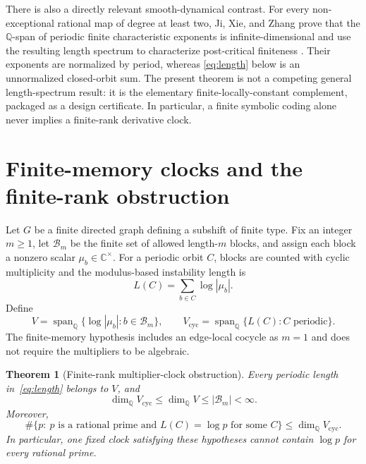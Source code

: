 \documentclass[11pt]{article}
\newtheorem{theorem}{Theorem}
\theoremstyle{definition}
\theoremstyle{remark}
\newcommand{\Q}{\mathbb{Q}}
\newcommand{\C}{\mathbb{C}}
\newcommand{\Bm}{\mathcal{B}_m}
\newcommand{\Vcyc}{V_{\mathrm{cyc}}}
\begin{document}
There is also a directly relevant smooth-dynamical contrast.  For every
non-exceptional rational map of degree at least two, Ji, Xie, and Zhang prove
that the \(\Q\)-span of periodic finite characteristic exponents is
infinite-dimensional and use the resulting length spectrum to characterize
post-critical finiteness \citep{ji2026space}.  Their exponents are normalized
by period, whereas \eqref{eq:length} below is an unnormalized closed-orbit
sum.  The present theorem is not a competing general length-spectrum result:
it is the elementary finite-locally-constant complement, packaged as a design
certificate.  In particular, a finite symbolic coding alone never implies a
finite-rank derivative clock.

\section{Finite-memory clocks and the finite-rank obstruction}
\label{sec:theorem}

Let \(G\) be a finite directed graph defining a subshift of finite type.  Fix
an integer \(m\geq1\), let \(\Bm\) be the finite set of allowed
length-\(m\) blocks, and assign each block a nonzero scalar
\(\mu_b\in\C^\times\).  For a periodic orbit \(C\), blocks are counted with
cyclic multiplicity and the modulus-based instability length is
\begin{equation}
 L(C)=\sum_{b\in C}\log|\mu_b|.
 \label{eq:length}
\end{equation}
Define
\begin{equation}
 V=\operatorname{span}_{\Q}
 \{\log|\mu_b|:b\in\Bm\},
 \qquad
 \Vcyc=\operatorname{span}_{\Q}\{L(C):C\text{ periodic}\}.
 \label{eq:spaces}
\end{equation}
The finite-memory hypothesis includes an edge-local cocycle as \(m=1\) and
does not require the multipliers to be algebraic.

\begin{theorem}[Finite-rank multiplier-clock obstruction]
\label{thm:finite-rank}
Every periodic length in~\eqref{eq:length} belongs to \(V\), and
\[
 \dim_{\Q}\Vcyc\leq\dim_{\Q}V\leq|\Bm|<\infty.
\]
Moreover,
\begin{equation}
 \#\{p:\ p\text{ is a rational prime and }
       L(C)=\log p\text{ for some }C\}
 \leq \dim_{\Q}\Vcyc.
 \label{eq:rank-bound}
\end{equation}
In particular, one fixed clock satisfying these hypotheses cannot contain
\(\log p\) for every rational prime.
\end{theorem}
\end{document}
